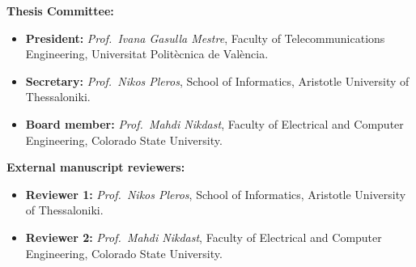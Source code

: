 \textbf{Thesis Committee:}

\begin{itemize}
	\item \textbf{President:} \textit{Prof.~Ivana Gasulla Mestre}, Faculty of Telecommunications Engineering, Universitat Politècnica de València.
	\item \textbf{Secretary:} \textit{Prof.~Nikos Pleros}, School of Informatics, Aristotle University of Thessaloniki.
	\item \textbf{Board member:} \textit{Prof.~Mahdi Nikdast}, Faculty of Electrical and Computer Engineering, Colorado State University.
\end{itemize}

\textbf{External manuscript reviewers:}
\begin{itemize}
	\item \textbf{Reviewer 1:} \textit{Prof.~Nikos Pleros}, School of Informatics, Aristotle University of Thessaloniki.
	\item \textbf{Reviewer 2:} \textit{Prof.~Mahdi Nikdast}, Faculty of Electrical and Computer Engineering, Colorado State University.
\end{itemize}
\newpage
